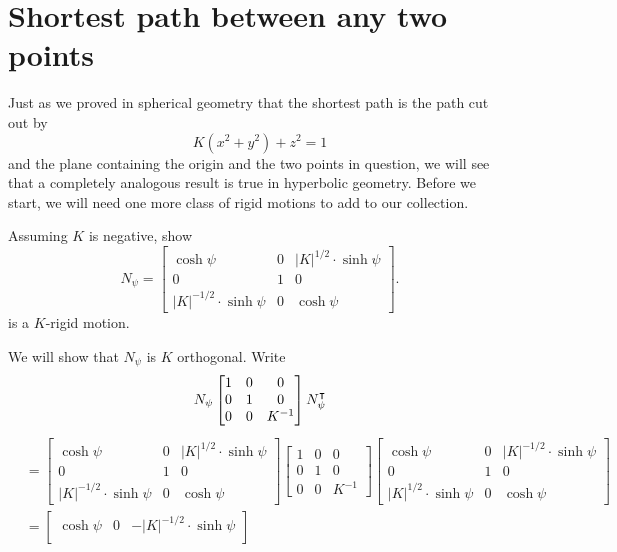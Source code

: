 \documentclass{ximera}
\begin{document}
\section{Shortest path between any two points}

Just as we proved in spherical geometry that the shortest path is the
path cut out by
\[
K\left(  x^{2}+y^{2}\right)  +z^{2}=1
\]
and the plane containing the origin and the two points in question, we
will see that a completely analogous result is true in hyperbolic
geometry. Before we start, we will need one more class of rigid
motions to add to our collection.


\begin{problem}
  Assuming $K$ is negative, show
  \[
  N_\psi=
  \begin{bmatrix}
    \cosh\psi & 0 & |K|^{1/2}\cdot\sinh\psi\\
    0 & 1 & 0\\
    |K|^{-1/2}\cdot\sinh\psi & 0 & \cosh\psi
  \end{bmatrix}.
  \]
  is a $K$-rigid motion.
  \begin{freeResponse}
    We will show that $N_\psi$ is $K$ orthogonal. Write
    \[
    N_\psi
      \begin{bmatrix}
        1 & 0 & 0 \\
        0 & 1 & 0 \\
        0 & 0 & K^{-1}
      \end{bmatrix}
      N_\psi^\intercal
    \]
    \begin{align*}
  &=
      \begin{bmatrix}
    \cosh\psi & 0 & |K|^{1/2}\cdot\sinh\psi\\
    0 & 1 & 0\\
    |K|^{-1/2}\cdot\sinh\psi & 0 & \cosh\psi
      \end{bmatrix}
      \begin{bmatrix}
        1 & 0 & 0 \\
        0 & 1 & 0 \\
        0 & 0 & K^{-1}
      \end{bmatrix}
 \begin{bmatrix}
    \cosh\psi & 0 & |K|^{-1/2}\cdot\sinh\psi\\
    0 & 1 & 0\\
    |K|^{1/2}\cdot\sinh\psi & 0 & \cosh\psi
 \end{bmatrix} \\
&=\begin{bmatrix}
    \cosh\psi & 0 & -|K|^{-1/2}\cdot\sinh\psi\\

\end{bmatrix}
\end{align*}
\end{freeResponse}
\end{problem}
\end{document}
